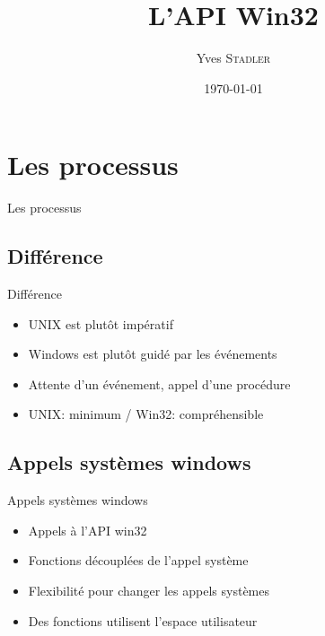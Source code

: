 \title{L'API Win32}
\subtitle{}

\author{Yves \textsc{Stadler}}

\date{\today}




\begin{frame}
\titlepage
\end{frame}

\def\sectitle{Les processus}
\section{\sectitle}

\begin{frame}{\sectitle}
    \def\subsectitle{Différence}
    \subsection{\subsectitle}

    \begin{block}{\subsectitle}
        \begin{itemize}
            \item UNIX est plutôt impératif
            \item Windows est plutôt guidé par les événements
            \item Attente d'un événement, appel d'une procédure
            \item UNIX: minimum / Win32: compréhensible
        \end{itemize}
    \end{block}

    \def\subsectitle{Appels systèmes windows}
    \subsection{\subsectitle}

        \begin{block}{\subsectitle}
            \begin{itemize}
                \item Appels à l'API win32
                \item Fonctions découplées de l'appel système
                \item Flexibilité pour changer les appels systèmes
                \item Des fonctions utilisent l'espace utilisateur
            \end{itemize}
        \end{block}
\end{frame}


